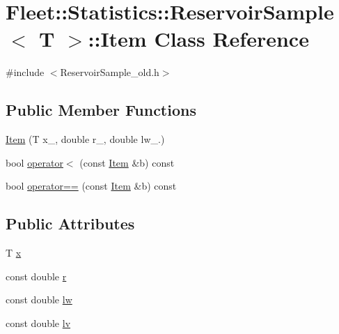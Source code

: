 \hypertarget{class_fleet_1_1_statistics_1_1_reservoir_sample_1_1_item}{}\section{Fleet\+:\+:Statistics\+:\+:Reservoir\+Sample$<$ T $>$\+:\+:Item Class Reference}
\label{class_fleet_1_1_statistics_1_1_reservoir_sample_1_1_item}


{\ttfamily \#include $<$Reservoir\+Sample\+\_\+old.\+h$>$}

\subsection*{Public Member Functions}
\begin{DoxyCompactItemize}
\item 
\hyperlink{class_fleet_1_1_statistics_1_1_reservoir_sample_1_1_item_acad6abfadffe65005f14a4c9616aabde}{Item} (T x\+\_\+, double r\+\_\+, double lw\+\_.)
\item 
bool \hyperlink{class_fleet_1_1_statistics_1_1_reservoir_sample_1_1_item_a06bf92e43a3bfe61e75a8bf0d6fa2c67}{operator$<$} (const \hyperlink{class_fleet_1_1_statistics_1_1_reservoir_sample_1_1_item}{Item} \&b) const
\item 
bool \hyperlink{class_fleet_1_1_statistics_1_1_reservoir_sample_1_1_item_ab3adc1f593aec74d7d140f8c3553546e}{operator==} (const \hyperlink{class_fleet_1_1_statistics_1_1_reservoir_sample_1_1_item}{Item} \&b) const
\end{DoxyCompactItemize}
\subsection*{Public Attributes}
\begin{DoxyCompactItemize}
\item 
T \hyperlink{class_fleet_1_1_statistics_1_1_reservoir_sample_1_1_item_ae845a0d698a99e1508241fd25b63dd3a}{x}
\item 
const double \hyperlink{class_fleet_1_1_statistics_1_1_reservoir_sample_1_1_item_a45c460752bf4e0b27ee406d2560479da}{r}
\item 
const double \hyperlink{class_fleet_1_1_statistics_1_1_reservoir_sample_1_1_item_af6e0c0e3569786a8896fcd7ab758a587}{lw}
\item 
const double \hyperlink{class_fleet_1_1_statistics_1_1_reservoir_sample_1_1_item_a0037b193d6712481b90416b51f2eb9d5}{lv}
\end{DoxyCompactItemize}


